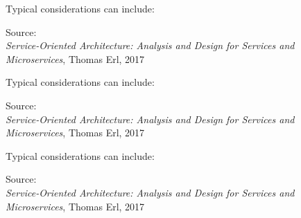 \documentclass[Screen16to9,17pt]{foils}
\begin{document}
\begin{quote}

\end{quote}

Typical considerations can include:
\begin{list2}
\item
\end{list2}
Source: {\footnotesize\\
\emph{Service‑Oriented Architecture: Analysis and Design for Services and Microservices}, Thomas Erl, 2017}



\begin{quote}

\end{quote}

Typical considerations can include:
\begin{list2}
\item
\end{list2}
Source: {\footnotesize\\
\emph{Service‑Oriented Architecture: Analysis and Design for Services and Microservices}, Thomas Erl, 2017}



\begin{quote}

\end{quote}

Typical considerations can include:
\begin{list2}
\item
\end{list2}
Source: {\footnotesize\\
\emph{Service‑Oriented Architecture: Analysis and Design for Services and Microservices}, Thomas Erl, 2017}

\slidenext
\end{document}
